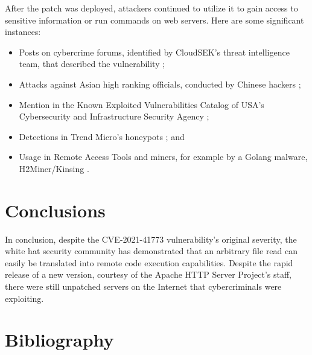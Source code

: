 \documentclass[12pt,a4paper,english,onecolumn]{IEEEtran}
\begin{document}
After the patch was deployed, attackers continued to utilize it to gain access to sensitive information or run commands on web servers. Here are some significant instances:
\begin{itemize}
    \item Posts on cybercrime forums, identified by CloudSEK's threat intelligence team, that described the vulnerability \cite{cloudsek};
    \item Attacks against Asian high ranking officials, conducted by Chinese hackers \cite{cloudsek};
    \item Mention in the Known Exploited Vulnerabilities Catalog of USA's Cybersecurity and Infrastructure Security Agency \cite{cisa_catalog};
    \item Detections in Trend Micro's honeypots \cite{trendmicro}; and
    \item Usage in Remote Access Tools and miners, for example by a Golang malware,\\H2Miner/Kinsing \cite{countercraft}.
\end{itemize}

\section{Conclusions}

In conclusion, despite the CVE-2021-41773 vulnerability's original severity, the white hat security community has demonstrated that an arbitrary file read can easily be translated into remote code execution capabilities. Despite the rapid release of a new version, courtesy of the Apache HTTP Server Project's staff, there were still unpatched servers on the Internet that cybercriminals were exploiting.

\section{Bibliography}

\nocite{*}
\printbibliography[heading=none]
\end{document}
